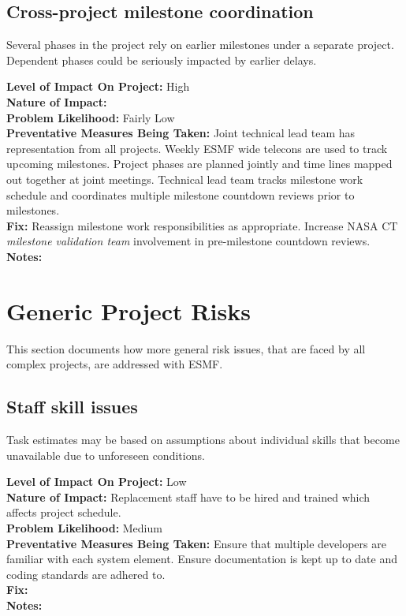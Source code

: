 \documentclass[english]{article}
\newcommand{\sreq}[1]{\subsection{\hspace{.2in}#1}}
\newenvironment
{reqlist}
{\begin{list} {} {} \rm \item[]}
{\end{list}}
\begin{document}
\sreq{Cross-project milestone coordination}
Several phases in the project rely on earlier milestones under a separate
project. Dependent phases could be seriously impacted by earlier delays.
\begin{reqlist}
{\bf Level of Impact On Project:} High \\
{\bf Nature of Impact:} \\
{\bf Problem Likelihood:} Fairly Low \\
{\bf Preventative Measures Being Taken:} Joint technical lead team has representation
from all projects. Weekly ESMF wide telecons are used to track upcoming
milestones. Project phases are planned jointly and time lines mapped out
together at joint meetings. Technical lead team tracks milestone
work schedule and coordinates multiple milestone countdown reviews prior 
to milestones.
\\
{\bf Fix:} Reassign milestone work responsibilities as appropriate.
Increase NASA CT {\it milestone validation team} involvement in pre-milestone
countdown reviews.
\\
{\bf Notes:} 
\end{reqlist}

\section{Generic Project Risks}

This section documents how more general risk issues, that are faced by all complex projects,
are addressed with ESMF.

\sreq{Staff skill issues}
Task estimates may be based on assumptions about individual skills that become unavailable
due to unforeseen conditions.
\begin{reqlist}
{\bf Level of Impact On Project:} Low \\
{\bf Nature of Impact:} Replacement staff have to be hired and trained which affects
project schedule.\\
{\bf Problem Likelihood:} Medium \\
{\bf Preventative Measures Being Taken:} Ensure that multiple developers are familiar
with each system element. Ensure documentation is kept up to date and coding
standards are adhered to.\\
{\bf Fix:} \\
{\bf Notes:} 
\end{reqlist}
\end{document}
